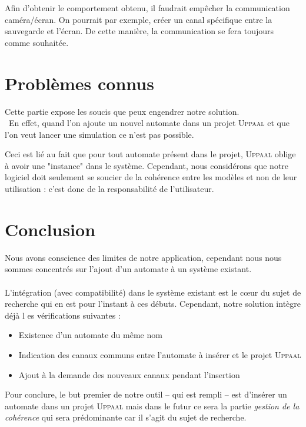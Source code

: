 \documentclass[12pt,a4paper]{report}
\begin{document}
    Afin d'obtenir le comportement obtenu, il faudrait empêcher la communication caméra/écran. On pourrait par exemple, créer un canal spécifique entre la sauvegarde et l'écran. De cette manière, la communication se fera toujours comme souhaitée.

\newpage
\section{Problèmes connus}
Cette partie expose les soucis que peux engendrer notre solution.
\\\
En effet, quand l'on ajoute un nouvel automate dans un projet \textsc{Uppaal} et que l'on 
veut lancer une simulation ce n'est pas possible.

Ceci est lié au fait que pour tout automate présent dans le projet, \textsc{Uppaal} oblige à 
avoir une "instance" dans le système. Cependant, nous considérons que notre logiciel doit 
seulement se soucier de la cohérence entre les modèles et non de leur utilisation : c'est 
donc de la responsabilité de l'utilisateur.

\section{Conclusion}
    Nous avons conscience des limites de notre application, cependant nous nous sommes concentrés sur l'ajout d'un automate à un système existant.
\\\\
    L'intégration (avec compatibilité) dans le système existant est le cœur du sujet de 
    recherche qui en est pour l'instant à ces débuts. Cependant, notre solution intègre déjà l
    es vérifications suivantes :
    
    \begin{itemize}
    \item Existence d'un automate du même nom
    \item Indication des canaux communs entre l'automate à insérer et le projet \textsc{Uppaal}
    \item Ajout à la demande des nouveaux canaux pendant l'insertion
    \end{itemize}
    
Pour conclure, le but premier de notre outil -- qui est rempli --  est d'insérer un automate 
dans un projet \textsc{Uppaal} mais dans le futur ce sera la partie 
\emph{gestion de la cohérence} qui sera prédominante car il s'agit du sujet de recherche.
\end{document}
